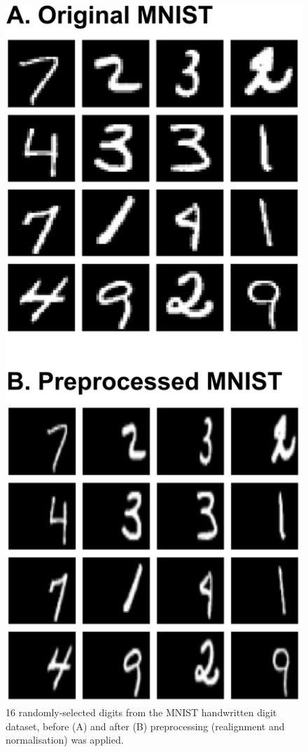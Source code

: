 \documentclass[a4paper,11pt,openany]{book}
\begin{document}
\begin{figure}[htbp]
\centering
\includegraphics[height=0.7\textheight]{./images/methods_mnist.png}
\caption[A subset of MNIST real handwritten digit samples before and after preprocessing]{\label{fig:org72b2a17}
16 randomly-selected digits from the MNIST handwritten digit dataset, before (A) and after (B) preprocessing (realignment and normalisation) was applied.}
\end{figure}
\end{document}
